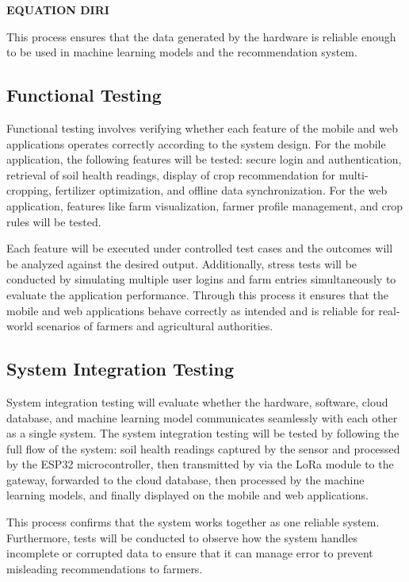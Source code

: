 {	
	\textbf{EQUATION DIRI}
	
	This process ensures that the data generated by the hardware is reliable enough to be used in machine learning models and the recommendation system.
	
	\subsection{Functional Testing}
	Functional testing involves verifying whether each feature of the mobile and web applications operates correctly according to the system design. For the mobile application, the following features will be tested: secure login and authentication, retrieval of soil health readings, display of crop recommendation for multi-cropping, fertilizer optimization, and offline data synchronization. For the web application, features like farm visualization, farmer profile management, and crop rules will be tested.
	
	Each feature will be executed under controlled test cases and the outcomes will be analyzed against the desired output. Additionally, stress tests will be conducted by simulating multiple user logins and farm entries simultaneously to evaluate the application performance. Through this process it ensures that the mobile and web applications behave correctly as intended and is reliable for real-world scenarios of farmers and agricultural authorities.
	
	\subsection{System Integration Testing}
	System integration testing will evaluate whether the hardware, software, cloud database, and machine learning model communicates seamlessly with each other as a single system. The system integration testing will be tested by following the full flow of the system: soil health readings captured by the sensor and processed by the ESP32 microcontroller, then transmitted by via the LoRa module to the gateway, forwarded to the cloud database, then processed by the machine learning models, and finally displayed on the mobile and web applications. 
	
	This process confirms that the system works together as one reliable system. Furthermore, tests will be conducted to observe how the system handles incomplete or corrupted data to ensure that it can manage error to prevent misleading recommendations to farmers.
	
}
